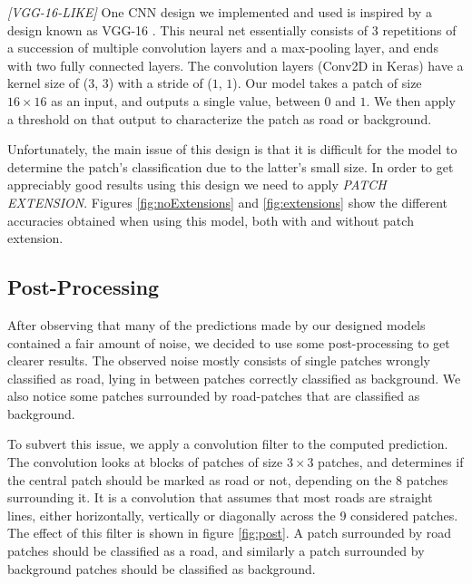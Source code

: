 \documentclass[10pt,conference,compsocconf]{IEEEtran}
\begin{document}
\textit{[VGG-16-LIKE]}
One CNN design we implemented and used is inspired by a design known as VGG-16 \cite{vgg}. This neural net essentially consists of 3 repetitions of a succession of multiple convolution layers and a max-pooling layer, and ends with two fully connected layers. The convolution layers (Conv2D in Keras) have a kernel size of ($3$, $3$) with a stride of ($1$, $1$). Our model takes a patch of size $16 \times 16$ as an input, and outputs a single value, between $0$ and $1$. We then apply a threshold on that output to characterize the patch as road or background.

Unfortunately, the main issue of this design is that it is difficult for the model to determine the patch's classification due to the latter's small size. In order to get appreciably good results using this design we need to apply \textit{PATCH EXTENSION}. Figures \ref{fig:noExtensions} and \ref{fig:extensions} show the different accuracies obtained when using this model, both with and without patch extension.


\subsection{Post-Processing} 
\label{ssec:post}

After observing that many of the predictions made by our designed models contained a fair amount of noise, we decided to use some post-processing to get clearer results. The observed noise mostly consists of single patches wrongly classified as road, lying in between patches correctly classified as background. We also notice some patches surrounded by road-patches that are classified as background.

To subvert this issue, we apply a convolution filter to the computed prediction. The convolution looks at blocks of patches of size $3 \times 3$ patches, and determines if the central patch should be marked as road or not, depending on the $8$ patches surrounding it. It is a convolution that assumes that most roads are straight lines, either horizontally, vertically or diagonally across the 9 considered patches. The effect of this filter is shown in figure \ref{fig:post}. A patch surrounded by road patches should be classified as a road, and similarly a patch surrounded by background patches should be classified as background.
\end{document}
